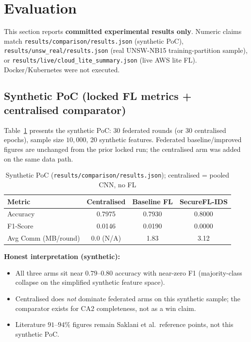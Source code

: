 \section{Evaluation}
\label{sec:evaluation}

This section reports \textbf{committed experimental results only}. Numeric claims match \texttt{results/comparison/results.json} (synthetic PoC), \texttt{results/unsw\_real/results.json} (real UNSW-NB15 training-partition sample), or \texttt{results/live/cloud\_lite\_summary.json} (live AWS lite FL). Docker/Kubernetes were not executed.

\subsection{Synthetic PoC (locked FL metrics + centralised comparator)}

Table~\ref{tab:detection_results} presents the synthetic PoC: 30 federated rounds (or 30 centralised epochs), sample size $10{,}000$, 20 synthetic features. Federated baseline/improved figures are unchanged from the prior locked run; the centralised arm was added on the same data path.

\begin{table}[h]
\centering
\begin{tabular}{lccc}
\toprule
\textbf{Metric} & \textbf{Centralised} & \textbf{Baseline FL} & \textbf{SecureFL-IDS} \\
\midrule
Accuracy & 0.7975 & 0.7930 & 0.8000 \\
F1-Score & 0.0146 & 0.0190 & 0.0000 \\
Avg Comm (MB/round) & 0.0 (N/A) & 1.83 & 3.12 \\
\bottomrule
\end{tabular}
\caption{Synthetic PoC (\texttt{results/comparison/results.json}); centralised = pooled CNN, no FL}
\label{tab:detection_results}
\end{table}

\textbf{Honest interpretation (synthetic):}

\begin{itemize}
    \item All three arms sit near $0.79$--$0.80$ accuracy with near-zero F1 (majority-class collapse on the simplified synthetic feature space).
    \item Centralised does \emph{not} dominate federated arms on this synthetic sample; the comparator exists for CA2 completeness, not as a win claim.
    \item Literature $91$--$94\%$ figures remain Saklani et al.\ reference points, not this synthetic PoC.
\end{itemize}

